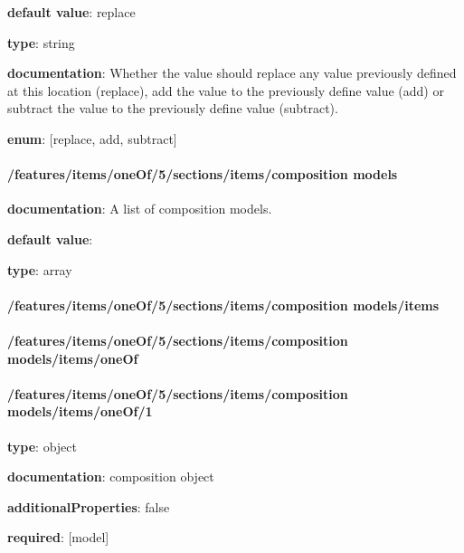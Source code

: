 \begin{itemized}
\item {\bf default value}: replace
\item {\bf type}: string
\item {\bf documentation}: Whether the value should replace any value previously defined at this location (replace), add the value to the previously define value (add) or subtract the value to the previously define value (subtract).
\item {\bf enum}: [replace, add, subtract]\end{itemized}\paragraph{/features/items/oneOf/5/sections/items/composition models} \begin{itemized}
\item {\bf documentation}: A list of composition models.
\item {\bf default value}: 
\item {\bf type}: array
\paragraph{/features/items/oneOf/5/sections/items/composition models/items} \begin{itemized}
\end{itemized}\end{itemized}\paragraph{/features/items/oneOf/5/sections/items/composition models/items/oneOf} \begin{itemized}
\end{itemized}\paragraph{/features/items/oneOf/5/sections/items/composition models/items/oneOf/1} \begin{itemized}
\item {\bf type}: object
\item {\bf documentation}: composition object
\item {\bf additionalProperties}: false
\item {\bf required}: [model]\end{itemized}
